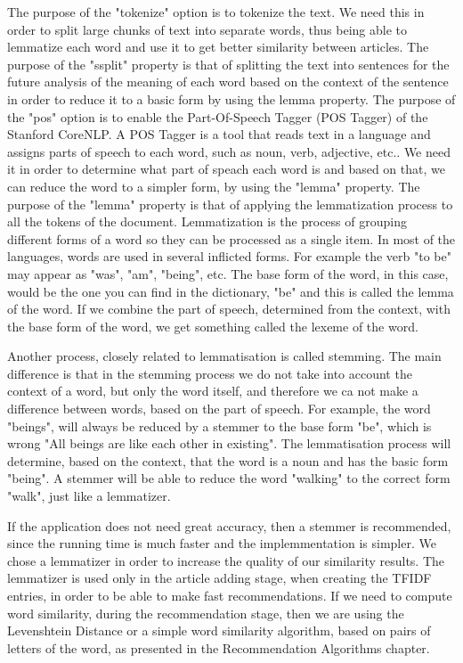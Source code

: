 The purpose of the "tokenize" option is to tokenize the text. We need this in order to split large chunks of text into separate words, thus being able to lemmatize each word and use it to get better similarity between articles.
The purpose of the "ssplit" property is that of splitting the text into sentences for the future analysis of the meaning of each word based on the context of the sentence in order to reduce it to a basic form by using the lemma property.
The purpose of the "pos" option is to enable the Part-Of-Speech Tagger (POS Tagger) of the Stanford CoreNLP. 
A POS Tagger is a tool that reads text in a language and assigns parts of speech to each word, such as noun, verb, adjective, etc..
We need it in order to determine what part of speach each word is and based on that, we can reduce the word to a simpler form, by using the "lemma" property.
The purpose of the "lemma" property is that of applying the lemmatization process to all the tokens of the document.
Lemmatization is the process of grouping different forms of a word so they can be processed as a single item.
In most of the languages, words are used in several inflicted forms. For example the verb "to be" may appear as "was", "am", "being", etc. The base form of the word, in this case, would be the one you can find in the dictionary, "be" and this is called the lemma of the word. If we combine the part of speech, determined from the context,  with the base form of the word, we get something called the lexeme of the word. 

Another process, closely related to lemmatisation is called stemming. The main difference is that in the stemming process we do not take into account the context of a word, but only the word itself, and therefore we ca not make a difference between words, based on the part of speech. For example, the word "beings", will always be reduced by a stemmer to the base form "be", which is wrong "All beings are like each other in existing". The lemmatisation process will determine, based on the context, that the word is a noun and has the basic form "being". A stemmer will be able to reduce the word "walking" to the correct form "walk", just like a lemmatizer.

If the application does not need great accuracy, then a stemmer is recommended, since the running time is much faster and the implemmentation is simpler.
We chose a lemmatizer in order to increase the quality of our similarity results. The lemmatizer is used only in the article adding stage, when creating the TFIDF entries, in order to be able to make fast recommendations. If we need to compute word similarity, during the recommendation stage, then we are using the Levenshtein Distance or a simple word similarity algorithm, based on pairs of letters of the word, as presented in the Recommendation Algorithms chapter.

